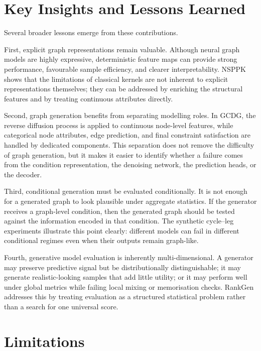 \section{Key Insights and Lessons Learned}
\label{sec:conclusion:insights}

Several broader lessons emerge from these contributions.

First, explicit graph representations remain valuable. Although neural graph
models are highly expressive, deterministic feature maps can provide strong
performance, favourable sample efficiency, and clearer interpretability. NSPPK
shows that the limitations of classical kernels are not inherent to explicit
representations themselves; they can be addressed by enriching the structural
features and by treating continuous attributes directly.

Second, graph generation benefits from separating modelling roles. In GCDG, the
reverse diffusion process is applied to continuous node-level features, while
categorical node attributes, edge prediction, and final constraint satisfaction
are handled by dedicated components. This separation does not remove the
difficulty of graph generation, but it makes it easier to identify whether a
failure comes from the condition representation, the denoising network, the
prediction heads, or the decoder.

Third, conditional generation must be evaluated conditionally. It is not enough
for a generated graph to look plausible under aggregate statistics. If the
generator receives a graph-level condition, then the generated graph should be
tested against the information encoded in that condition. The synthetic
cycle--leg experiments illustrate this point clearly: different models can fail
in different conditional regimes even when their outputs remain graph-like.

Fourth, generative model evaluation is inherently multi-dimensional. A
generator may preserve predictive signal but be distributionally
distinguishable; it may generate realistic-looking samples that add little
utility; or it may perform well under global metrics while failing local
mixing or memorisation checks. RankGen addresses this by treating evaluation as
a structured statistical problem rather than a search for one universal score.

\section{Limitations}
\label{sec:conclusion:limitations}

